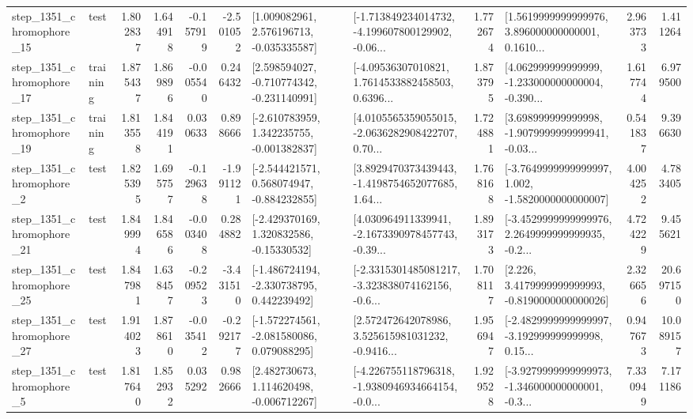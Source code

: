 \begin{tabular}{llrrrrllrlrr}
 step\_1351\_chromophore\_15 &      test &      1.802837 &    1.644918 &     -0.157919 & -2.501052 &    [1.009082961, 2.576196713, -0.035335587] &  [-1.713849234014732, -4.199607800129902, -0.06... &       1.772674 &  [1.5619999999999976, 3.896000000000001, 0.1610... &            2.963733 &          1.411264 \\
 step\_1351\_chromophore\_17 &  training &      1.875437 &    1.869896 &     -0.005540 &  0.246432 &   [2.598594027, -0.710774342, -0.231140991] &  [-4.09536307010821, 1.7614533882458503, 0.6396... &       1.873795 &  [4.062999999999999, -1.233000000000004, -0.390... &            1.617744 &          6.979500 \\
 step\_1351\_chromophore\_19 &  training &      1.813558 &    1.844191 &      0.030633 &  0.898666 &   [-2.610783959, 1.342235755, -0.001382837] &  [4.0105565359055015, -2.0636282908422707, 0.70... &       1.724881 &  [3.698999999999998, -1.9079999999999941, -0.03... &            0.541837 &          9.396630 \\
  step\_1351\_chromophore\_2 &      test &      1.825395 &    1.695757 &     -0.129638 & -1.991121 &   [-2.544421571, 0.568074947, -0.884232855] &  [3.8929470373439443, -1.4198754652077685, 1.64... &       1.768168 &  [-3.7649999999999997, 1.002, -1.5820000000000007] &            4.004252 &          4.783405 \\
 step\_1351\_chromophore\_21 &      test &      1.849994 &    1.846586 &     -0.003408 &  0.284882 &    [-2.429370169, 1.320832586, -0.15330532] &  [4.030964911339941, -2.1673390978457743, -0.39... &       1.893173 &  [-3.4529999999999976, 2.2649999999999935, -0.2... &            4.724229 &          9.455621 \\
 step\_1351\_chromophore\_25 &      test &      1.847981 &    1.638457 &     -0.209523 & -3.431510 &   [-1.486724194, -2.330738795, 0.442239492] &  [-2.3315301485081217, -3.323838074162156, -0.6... &       1.708117 &   [2.226, 3.4179999999999993, -0.8190000000000026] &            2.326656 &         20.697150 \\
 step\_1351\_chromophore\_27 &      test &      1.914023 &    1.878610 &     -0.035412 & -0.292177 &   [-1.572274561, -2.081580086, 0.079088295] &  [2.572472642078986, 3.525615981031232, -0.9416... &       1.956947 &  [-2.4829999999999997, -3.192999999999998, 0.15... &            0.947673 &         10.089157 \\
  step\_1351\_chromophore\_5 &      test &      1.817640 &    1.852932 &      0.035292 &  0.982666 &    [2.482730673, 1.114620498, -0.006712267] &  [-4.226755118796318, -1.9380946934664154, -0.0... &       1.929528 &  [-3.9279999999999973, -1.346000000000001, -0.3... &            7.330949 &          7.171186 \\

\end{tabular}
